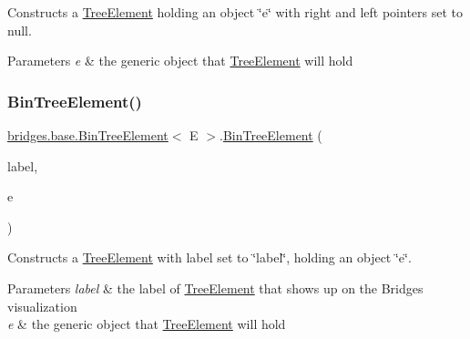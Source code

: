Constructs a \mbox{\hyperlink{classbridges_1_1base_1_1_tree_element}{Tree\+Element}} holding an object \char`\"{}e\char`\"{} with right and left pointers set to null.


\begin{DoxyParams}{Parameters}
{\em e} & the generic object that \mbox{\hyperlink{classbridges_1_1base_1_1_tree_element}{Tree\+Element}} will hold \\
\hline
\end{DoxyParams}
\mbox{\label{classbridges_1_1base_1_1_bin_tree_element_aac0e300f53d5c1c89b747a1f2c5d54c9}} 
\subsubsection{\texorpdfstring{BinTreeElement()}{BinTreeElement()}\hspace{0.1cm}{\footnotesize\ttfamily [3/5]}}
{\footnotesize\ttfamily \mbox{\hyperlink{classbridges_1_1base_1_1_bin_tree_element}{bridges.\+base.\+Bin\+Tree\+Element}}$<$ E $>$.\mbox{\hyperlink{classbridges_1_1base_1_1_bin_tree_element}{Bin\+Tree\+Element}} (\begin{DoxyParamCaption}\item[{String}]{label,  }\item[{E}]{e }\end{DoxyParamCaption})}

Constructs a \mbox{\hyperlink{classbridges_1_1base_1_1_tree_element}{Tree\+Element}} with label set to \char`\"{}label\char`\"{}, holding an object \char`\"{}e\char`\"{}.


\begin{DoxyParams}{Parameters}
{\em label} & the label of \mbox{\hyperlink{classbridges_1_1base_1_1_tree_element}{Tree\+Element}} that shows up on the Bridges visualization\\
\hline
{\em e} & the generic object that \mbox{\hyperlink{classbridges_1_1base_1_1_tree_element}{Tree\+Element}} will hold \\
\hline
\end{DoxyParams}
\mbox{\label{classbridges_1_1base_1_1_bin_tree_element_ab402fac72353087b1b93e82db007e1d7}} 
